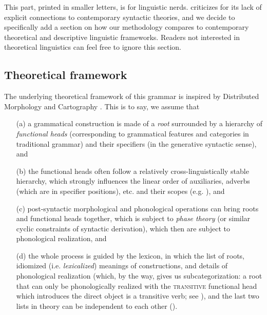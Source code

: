 \documentclass[UTF8, a4paper, oneside, scheme=plain, 12pt]{ctexrep}
\newcommand*{\term}[1]{\emph{#1}}
\newcommand*{\category}[1]{\textsc{#1}}
\begin{document}
{
\small

This part, printed in smaller letters, is for linguistic nerds.
\citet{culicover2004cambridge} criticizes \citet{cgel}
for its lack of explicit connections to contemporary syntactic theories,
and we decide to specifically add a section on how our methodology compares to contemporary
theoretical and descriptive linguistic frameworks.
Readers not interested in theoretical linguistics can feel free to ignore this section.

\subsection{Theoretical framework}\label{sec:theory.framework}

The underlying theoretical framework of this grammar is inspired by Distributed Morphology \citep{siddiqi2009syntax} and Cartography \citep{cinque1999adverbs}.
This is to say, we assume that
\begin{itemize}
    \item[(a)] a grammatical construction is made of a \emph{root} surrounded by a hierarchy of \emph{functional heads} (corresponding to grammatical features and categories in traditional grammar) and their specifiers (in the generative syntactic sense), and 
    \item[(b)] the functional heads often follow a relatively cross-linguistically stable hierarchy,
    which strongly influences the linear order of auxiliaries, adverbs (which are in specifier positions), etc. and their scopes
    (e.g. ), and 
    \item[(c)] post-syntactic morphological and phonological operations can bring roots and functional heads together,
    which is subject to \emph{phase theory} (or similar cyclic constraints of syntactic derivation),
    which then are subject to phonological realization, and 
    \item[(d)] the whole process is guided by the lexicon,
    in which the list of roots, idiomized (i.e. \term{lexicalized}) meanings of constructions,
    and details of phonological realization
    (which, by the way, gives us subcategorization:
    a root that can only be phonologically realized with the \category{transitive} functional head
    which introduces the direct object is a transitive verb; see \citealt{siddiqi2009syntax}),
    and the last two lists in theory can be independent to each other
    ().
\end{itemize}

}
\end{document}

